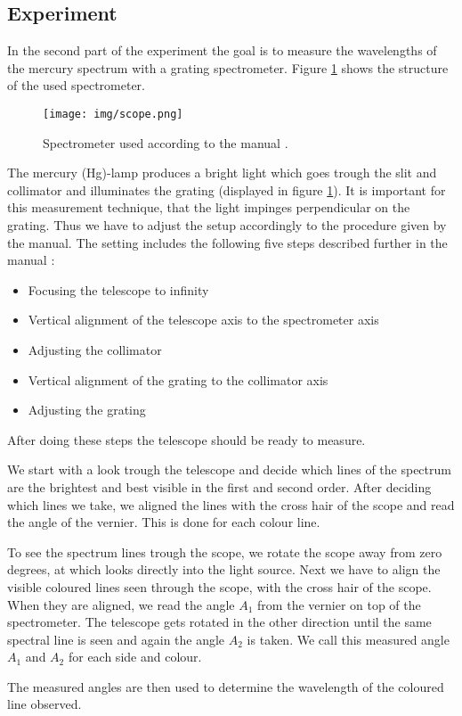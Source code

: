 \subsection{Experiment}
In the second part of the experiment the goal is to measure the wavelengths of the mercury spectrum with a grating spectrometer.
Figure \ref{fig::scope} shows the structure of the used spectrometer. 
\begin{figure} [ht]
	\centering
	\texttt{[image: img/scope.png]}
	\caption{Spectrometer used according to the manual \cite{manual}.}
	\label{fig::scope}
\end{figure}

The mercury (Hg)-lamp produces a bright light which goes trough the slit and collimator and illuminates the grating (displayed in figure \ref{fig::scope}).
It is important for this measurement technique, that the light impinges perpendicular on the grating.
Thus we have to adjust the setup accordingly to the procedure given by the manual\cite{manual}.
The setting includes the following five steps described further in the manual \cite{manual}:
\begin{itemize}
	\item Focusing the telescope to infinity
	\item Vertical alignment of the telescope axis to the spectrometer axis
	\item Adjusting the collimator
	\item Vertical alignment of the grating to the collimator axis
	\item Adjusting the grating
\end{itemize}
After doing these steps the telescope should be ready to measure.

We start with a look trough the telescope and decide which lines of the spectrum are the brightest and best visible in the first and second order.
After deciding which lines we take, we aligned the lines with the cross hair of the scope and read the angle of the vernier.
This is done for each colour line.


To see the spectrum lines trough the scope, we rotate the scope away from zero degrees, at which looks directly into the light source.
Next we have to align the visible coloured lines seen through the scope, with the cross hair of the scope.
When they are aligned, we read the angle $A_1$ from the vernier on top of the spectrometer.
The telescope gets rotated in the other direction until the same spectral line is seen and again the angle $A_2$ is taken.
We call this measured angle $A_1$ and $A_2$ for each side and colour.


The measured angles are then used to determine the wavelength of the coloured line observed.
 